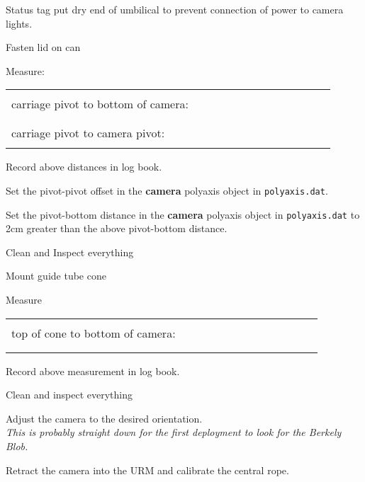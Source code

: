 \begin{enumerate}
  Status tag put dry end of umbilical to prevent connection
  of power to camera lights.

\checkitem Fasten lid on can

\checkitem Measure:
     \begin{center}
     \begin{tabular}{|l|}
     \hline
      \\
     carriage pivot to bottom of camera:~~~~~~~~~~~~~~~~~~~~~~~~\\
      \\
     \hline
      \\
     carriage pivot to camera pivot:~~~~~~~~~~~~~~~~~~~~~~~~\\
      \\
     \hline
     \end{tabular}
     \end{center}
\checkitem Record above distances in log book.

\checkitem Set the pivot-pivot offset in the {\bf camera} polyaxis
  object in {\tt polyaxis.dat}.

\checkitem Set the pivot-bottom distance in the {\bf camera} polyaxis
  object in {\tt polyaxis.dat} to 2cm greater than the above
  pivot-bottom distance.

\checkitem Clean and Inspect everything

\checkitem Mount guide tube cone

\checkitem Measure
     \begin{center}
     \begin{tabular}{|l|}
     \hline
      \\
     top of cone to bottom of camera:~~~~~~~~~~~~~~~~~~~~~~~~\\
      \\
      \\
     \hline
     \end{tabular}
     \end{center}
\checkitem Record above measurement in log book.

\checkitem Clean and inspect everything

\checkitem Adjust the camera to the desired orientation.\\
  {\em This is probably straight down for the first deployment
   to look for the Berkely Blob.}

\checkitem Retract the camera into the URM and calibrate the central
  rope.


\end{enumerate}



